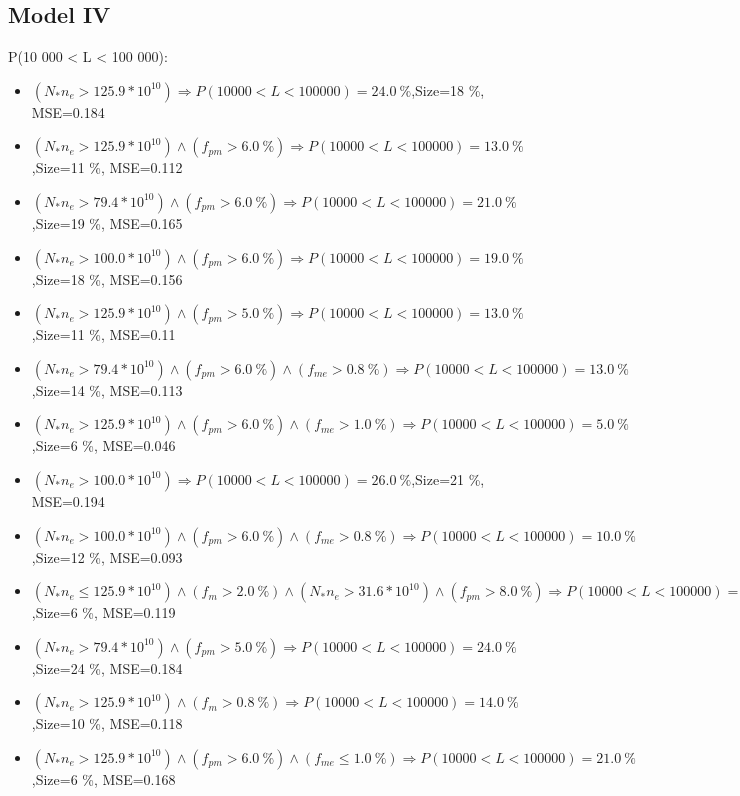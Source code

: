 \documentclass[numbered]{CSL}
\begin{document}
\subsection{Model IV}
P(10 000 < L < 100 000):
\begin{itemize}
\item $(N_* n_e > 125.9 * 10^{10}) \Rightarrow P(10 000 < L < 100 000) = 24.0~\%$,\hfill Size=18 \%, MSE=0.184
\item $(N_* n_e > 125.9 * 10^{10}) \land (f_{pm} > 6.0~\%) \Rightarrow P(10 000 < L < 100 000) = 13.0~\%$,\hfill Size=11 \%, MSE=0.112
\item $(N_* n_e > 79.4 * 10^{10}) \land (f_{pm} > 6.0~\%) \Rightarrow P(10 000 < L < 100 000) = 21.0~\%$,\hfill Size=19 \%, MSE=0.165
\item $(N_* n_e > 100.0 * 10^{10}) \land (f_{pm} > 6.0~\%) \Rightarrow P(10 000 < L < 100 000) = 19.0~\%$,\hfill Size=18 \%, MSE=0.156
\item $(N_* n_e > 125.9 * 10^{10}) \land (f_{pm} > 5.0~\%) \Rightarrow P(10 000 < L < 100 000) = 13.0~\%$,\hfill Size=11 \%, MSE=0.11
\item $(N_* n_e > 79.4 * 10^{10}) \land (f_{pm} > 6.0~\%) \land (f_{me} > 0.8~\%) \Rightarrow P(10 000 < L < 100 000) = 13.0~\%$,\hfill Size=14 \%, MSE=0.113
\item $(N_* n_e > 125.9 * 10^{10}) \land (f_{pm} > 6.0~\%) \land (f_{me} > 1.0~\%) \Rightarrow P(10 000 < L < 100 000) = 5.0~\%$,\hfill Size=6 \%, MSE=0.046
\item $(N_* n_e > 100.0 * 10^{10}) \Rightarrow P(10 000 < L < 100 000) = 26.0~\%$,\hfill Size=21 \%, MSE=0.194
\item $(N_* n_e > 100.0 * 10^{10}) \land (f_{pm} > 6.0~\%) \land (f_{me} > 0.8~\%) \Rightarrow P(10 000 < L < 100 000) = 10.0~\%$,\hfill Size=12 \%, MSE=0.093
\item $(N_* n_e \leq 125.9 * 10^{10}) \land (f_m > 2.0~\%) \land (N_* n_e > 31.6 * 10^{10}) \land (f_{pm} > 8.0~\%) \Rightarrow P(10 000 < L < 100 000) = 14.0~\%$,\hfill Size=6 \%, MSE=0.119
\item $(N_* n_e > 79.4 * 10^{10}) \land (f_{pm} > 5.0~\%) \Rightarrow P(10 000 < L < 100 000) = 24.0~\%$,\hfill Size=24 \%, MSE=0.184
\item $(N_* n_e > 125.9 * 10^{10}) \land (f_m > 0.8~\%) \Rightarrow P(10 000 < L < 100 000) = 14.0~\%$,\hfill Size=10 \%, MSE=0.118
\item $(N_* n_e > 125.9 * 10^{10}) \land (f_{pm} > 6.0~\%) \land (f_{me} \leq 1.0~\%) \Rightarrow P(10 000 < L < 100 000) = 21.0~\%$,\hfill Size=6 \%, MSE=0.168

\end{itemize}
\end{document}
